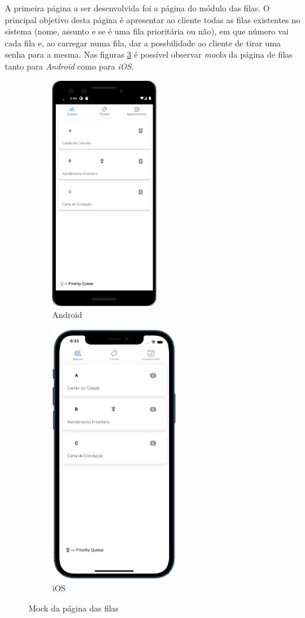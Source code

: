 \documentclass[12pt,a4paper]{article}
\begin{document}
A primeira página a ser desenvolvida foi a página do módulo das filas. O principal objetivo desta página é apresentar ao cliente
todas as filas existentes no sistema (nome, assunto e se é uma fila prioritária ou não), em que número vai cada fila e,
ao carregar numa fila, dar a possbilidade ao cliente de tirar uma senha para a mesma. Nas figuras \ref{fig:mockQueues} é possível observar 
\textit{mocks} da página de filas tanto para \textit{Android} como para \textit{iOS}.\par
\pagebreak
\begin{figure}[h]
\centering
\begin{subfigure}[h]{.5\textwidth}
  \centering
  \includegraphics[scale=0.65]{mockQueuesAndroid}
  \caption{Android}
  \label{fig:queuesAndroid}
\end{subfigure}%
\begin{subfigure}[h]{.5\textwidth}
  \centering
  \includegraphics[scale=0.55]{mockQueuesIOS}
  \caption{iOS}
  \label{fig:queuesIos}
\end{subfigure}
\caption{Mock da página das filas}
\label{fig:mockQueues}
\end{figure}
\end{document}
